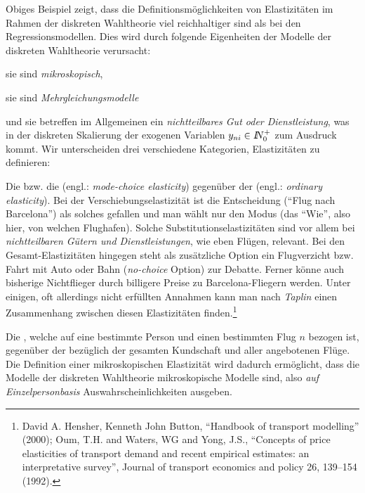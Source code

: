 Obiges Beispiel zeigt, dass die Definitionsm\"oglichkeiten 
von Elastizit\"aten im Rahmen der diskreten Wahltheorie viel
reichhaltiger sind als bei den Regressionsmodellen. Dies wird durch
folgende Eigenheiten der 
Modelle der diskreten Wahltheorie verursacht:
\bi
\item sie sind \emph{mikroskopisch},
\item sie sind \emph{Mehrgleichungsmodelle}
\item und sie betreffen im Allgemeinen ein \emph{nichtteilbares Gut oder
  Dienstleistung}, was in der diskreten Skalierung der exogenen Variablen
  $y_{ni} \in I\!\!N_0^+$ zum Ausdruck kommt.
\ei
 Wir unterscheiden drei verschiedene Kategorien, 
Elastizit\"aten zu definieren:
\benum
\item Die  bzw. die
  (engl.: \emph{mode-choice elasticity})
  gegen\-\"uber der 
 (engl.: \emph{ordinary elasticity}). Bei der
  Verschiebungselastizit\"at ist die Entscheidung (``Flug nach
  Barcelona'') als solches gefallen und man w\"ahlt nur den Modus (das
  ``Wie'', also hier, von welchen Flughafen). Solche
  Substitutionselastizit\"aten sind vor allem bei 
  \emph{nichtteilbaren G\"utern und Dienstleistungen}, wie eben
  Fl\"ugen, relevant.
 Bei den Gesamt-Elastizit\"aten hingegen steht als
  zus\"atzliche Option ein Flugverzicht bzw. Fahrt mit Auto oder
  Bahn (\emph{no-choice} Option) zur Debatte. Ferner k\"onne auch
  bisherige Nichtflieger durch
  billigere Preise zu Barcelona-Fliegern werden. Unter einigen, oft
  allerdings nicht erf\"ullten Annahmen kann man nach \emph{Taplin}
  einen Zusammenhang zwischen diesen Elastizit\"aten finden.\footnote{David A. Hensher, Kenneth John Button,
``Handbook of transport modelling'' (2000); Oum, T.H. and Waters, WG
and Yong, J.S., ``Concepts of price elasticities of transport demand
and recent empirical estimates: an interpretative survey'', Journal of
transport economics and policy 26, 139--154 (1992).}


\item Die , welche auf eine
  bestimmte Person und einen bestimmten Flug $n$ bezogen ist,
  gegen\"uber der  bez\"uglich der gesamten Kundschaft und aller
  angebotenen Fl\"uge. Die Definition
  einer mikroskopischen Elastizit\"at wird dadurch erm\"oglicht, dass
  die Modelle der diskreten Wahltheorie mikroskopische Modelle sind,
  also \emph{auf Einzelpersonbasis}
  Auswahrscheinlichkeiten ausgeben. 


